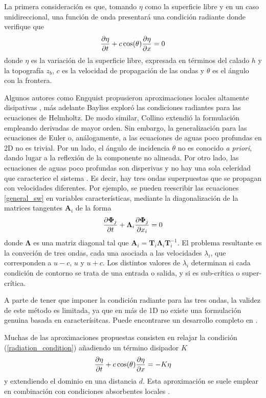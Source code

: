 La primera consideración es que, tomando $\eta$ como la superficie libre y en un caso unidireccional, una función de onda presentará una condición radiante donde verifique que
\begin{equation} \label{radiation_condition}
    \frac{\partial\eta}{\partial t} + c \cos(\theta)\frac{\partial\eta}{\partial x} = 0
\end{equation}
donde $\eta$ es la variación de la superficie libre, expresada en términos del calado $h$ y la topografía $z_b$, $c$ es la velocidad de propagación de las ondas y $\theta$ es el ángulo con la frontera.

Algunos autores como Engquist propusieron aproximaciones locales altamente disipativas \cite{engquist1977}, más adelante Bayliss \cite{bayliss1982} exploró las condiciones radiantes para las ecuaciones de Helmholtz. De modo similar, Collino \cite{collino1993} extendió la formulación empleando derivadas de mayor orden. Sin embargo, la generalización para las ecuaciones de Euler o, análogamente, a las ecuaciones de aguas poco profundas en 2D no es trivial. Por un lado, el ángulo de incidencia $\theta$ no es conocido \emph{a priori}, dando lugar a la reflexión de la componente no alineada. Por otro lado, las ecuaciones de aguas poco profundas son disperivas y no hay una sola celeridad que caracterice el sistema \cite{wei1995}. Es decir, hay tres ondas superpuestas que se propagan con velocidades diferentes. Por ejemplo, se pueden reescribir las ecuaciones \ref{general_sw} en variables características, mediante la diagonalización de la matrices tangentes $\mathbf{A}_i$ de la forma
\begin{equation}
    \frac{\partial\bm\Phi_j}{\partial t} + \bm\Lambda_i \frac{\partial\bm\Phi_j}{\partial x_i} = 0
\end{equation}
donde $\bm\Lambda$ es una matriz diagonal tal que $\bm A_i = \bm T_i \bm\Lambda_i \bm T_i^{-1}$. El problema resultante es la conveción de tres ondas, cada una asociada a las velocidades $\lambda_i$, que corresponden a $u-c$, $u$ y $u+c$. Los distintos valores de $\lambda_i$ determinan si cada condición de contorno se trata de una entrada o salida, y si es sub-crítica o super-crítica.

A parte de tener que imponer la condición radiante para las tres ondas, la validez de este método es limitada, ya que en más de 1D no existe una formulación genuina basada en caracterísitcas. Puede encontrarse un desarrollo completo en \cite{lie2001}.

Muchas de las aproximaciones propuestas \cite{israeli1981,navon2004,carmigniani2018} consisten en relajar la condición (\ref{radiation_condition}) añadiendo un término disipador $K$
\begin{equation} \label{radiation_absorbing_condition}
    \frac{\partial\eta}{\partial t} + c \cos(\theta)\frac{\partial\eta}{\partial x} = -K\eta
\end{equation}
y extendiendo el dominio en una distancia $d$. Esta aproximación se suele emplear en combinación con condiciones absorbentes locales \cite{wei1995}.

